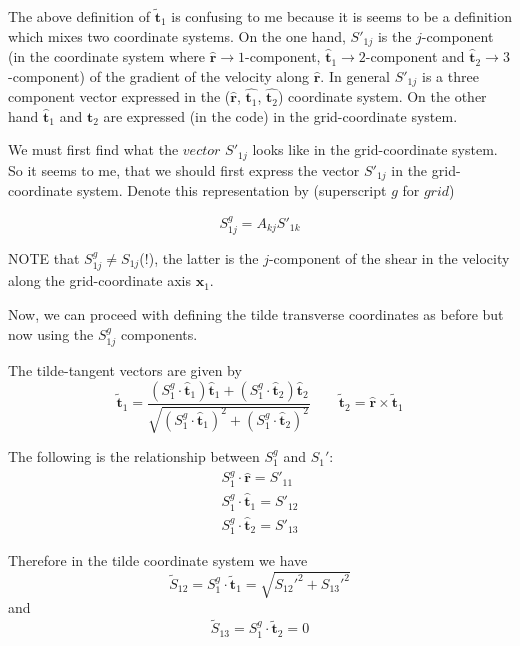 \documentclass[12pt]{article}
\begin{document}
The above definition of $\bm{{\tilde t}}_1$ is confusing to me because
it is seems to be a definition which mixes two coordinate systems. On
the one hand, $S'_{1j}$ is the $j$-component (in the coordinate system
where $\hat{\bm{ r}} \rightarrow 1$-component, $\hat{\bm{t}}_1
\rightarrow 2$-component and $\hat{\bm{ t}}_2 \rightarrow
3$-component) of the gradient of the velocity along $\hat{\bm{
r}}$. In general $S'_{1j}$ is a three component vector expressed in
the ($\hat{\bm{ r}}$, $\hat{\bm{t}_1}$, $\hat{\bm{t}_2}$) coordinate
system. On the other hand $\hat{\bm{t}}_1$ and $\hat{\bm{t}}_2$ are
expressed (in the code) in the grid-coordinate system.

We must first find what the $vector$ $S'_{1j}$ looks like in the
grid-coordinate system. So it seems to me, that we should first
express the vector $S'_{1j}$ in the grid-coordinate system. Denote
this representation by (superscript $g$ for $grid$)

\begin{equation}S^g_{1j}  =  A_{kj} S'_{1k}\end{equation}

NOTE that $S^g_{1j} \neq S_{1j}$(!), the latter is the $j$-component
of the shear in the velocity along the grid-coordinate axis
$\bm{x}_1$.  

Now, we can proceed with defining the tilde transverse coordinates as before but now using the $S^g_{1j}$ components.
 
The tilde-tangent vectors are given by 
\begin{equation}
\bm{{\tilde t}}_1 = \frac{(S^g_{1}\cdot \hat{\bm{t}}_1) \bm{{\hat t}}_1 +  (S^g_{1}\cdot\hat{\bm{t}}_2) \bm{{\hat t}}_2 }
                         {\sqrt{ (S^g_{1}\cdot \hat{\bm{t}}_1)^2 +  (S^g_{1}\cdot\hat{\bm{t}}_2)^2 }}
\qquad
\bm{{\tilde t}}_2 = \bm{{\hat r}} \times \bm{{\tilde t}}_1
\end{equation}

The following is the relationship between $S_1^g$ and $S_1'$:
\begin{eqnarray}
S^g_{1}\cdot \hat{\bm {r}} = S'_{11}\\
S^g_{1}\cdot \hat{\bm {t}}_1 = S'_{12}\\
S^g_{1}\cdot \hat{\bm {t}}_2 = S'_{13}
\end{eqnarray}

Therefore in the tilde coordinate system we have 
\begin{equation}
\tilde S_{12} =  S^g_{1} \cdot \bm{{\tilde t}}_1 = 
 \sqrt{ S_{12}'^2 + S_{13}'^2 } 
\end{equation}
and 
\begin{equation}
\tilde S_{13} = S^g_{1}\cdot \bm{{\tilde t}}_2 =  0
\end{equation}
\end{document}
